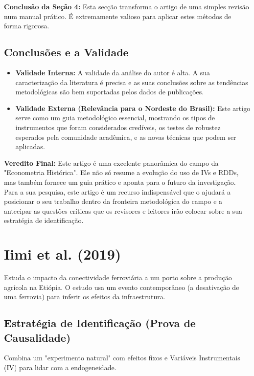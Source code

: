 \documentclass[12pt, a4paper]{article}
\begin{document}
\noindent\textbf{Conclusão da Seção 4:} Esta secção transforma o artigo de uma simples revisão num manual prático. É extremamente valioso para aplicar estes métodos de forma rigorosa.

\subsection{Conclusões e a Validade}
\begin{itemize}
    \item \textbf{Validade Interna:} A validade da análise do autor é alta. A sua caracterização da literatura é precisa e as suas conclusões sobre as tendências metodológicas são bem suportadas pelos dados de publicações.
    \item \textbf{Validade Externa (Relevância para o Nordeste do Brasil):} Este artigo serve como um guia metodológico essencial, mostrando os tipos de instrumentos que foram considerados credíveis, os testes de robustez esperados pela comunidade acadêmica, e as novas técnicas que podem ser aplicadas.
\end{itemize}

\noindent\textbf{Veredito Final:} Este artigo é uma excelente panorâmica do campo da "Econometria Histórica". Ele não só resume a evolução do uso de IVs e RDDs, mas também fornece um guia prático e aponta para o futuro da investigação. Para a sua pesquisa, este artigo é um recurso indispensável que o ajudará a posicionar o seu trabalho dentro da fronteira metodológica do campo e a antecipar as questões críticas que os revisores e leitores irão colocar sobre a sua estratégia de identificação.


\section{Iimi et al. (2019)}
Estuda o impacto da conectividade ferroviária a um porto sobre a produção agrícola na Etiópia. O estudo usa um evento contemporâneo (a desativação de uma ferrovia) para inferir os efeitos da infraestrutura.

\subsection{Estratégia de Identificação (Prova de Causalidade)}
Combina um "experimento natural" com efeitos fixos e Variáveis Instrumentais (IV) para lidar com a endogeneidade.
\end{document}
